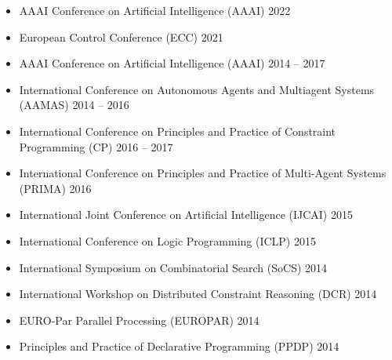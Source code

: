 \begin{itemize}
    \item AAAI Conference on Artificial Intelligence (AAAI) \hfill {2022}
\end{itemize}

\begin{itemize}
  
  \item European Control Conference (ECC) \hfill 2021

  \item AAAI Conference on Artificial Intelligence (AAAI) \hfill {2014 -- 2017}
  
  \item International Conference on Autonomous Agents and Multiagent Systems (AAMAS) \hfill {2014 -- 2016}
    
  \item International Conference on Principles and Practice of Constraint Programming (CP) \hfill{2016 -- 2017} 
  
  \item International Conference on Principles and Practice of Multi-Agent Systems (PRIMA) \hfill{2016}
  
  \item International Joint Conference on Artificial Intelligence (IJCAI) \hfill {2015}
  
  \item International Conference on Logic Programming (ICLP) \hfill {2015}
  
  \item International Symposium on Combinatorial Search (SoCS) \hfill {2014}
  
  \item International Workshop on Distributed Constraint Reasoning (DCR) \hfill 2014
  
  \item EURO-Par Parallel Processing (EUROPAR) \hfill {2014}
  
  \item Principles and Practice of Declarative Programming (PPDP) \hfill {2014}
\end{itemize}

